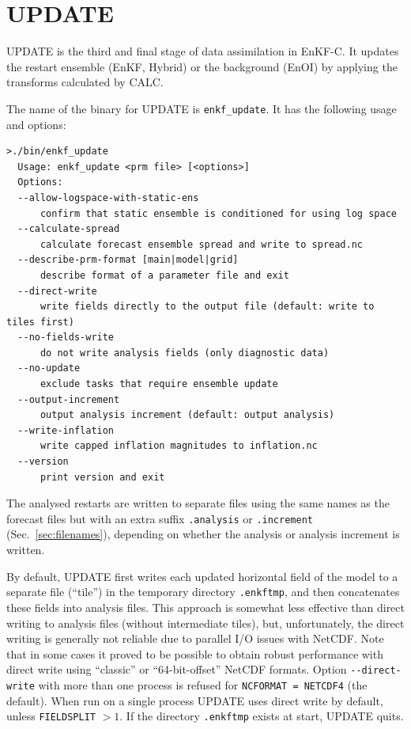 \documentclass[11pt]{report}
\begin{document}
\section{UPDATE}

UPDATE is the third and final stage of data assimilation in EnKF-C.
It updates the restart ensemble (EnKF, Hybrid) or the background (EnOI) by applying the transforms calculated by CALC.

The name of the binary for UPDATE is \verb|enkf_update|.
It has the following usage and options:
\begin{Verbatim}[frame=single,fontsize=\footnotesize]
>./bin/enkf_update
  Usage: enkf_update <prm file> [<options>]
  Options:
  --allow-logspace-with-static-ens
      confirm that static ensemble is conditioned for using log space
  --calculate-spread
      calculate forecast ensemble spread and write to spread.nc
  --describe-prm-format [main|model|grid]
      describe format of a parameter file and exit
  --direct-write
      write fields directly to the output file (default: write to tiles first)
  --no-fields-write
      do not write analysis fields (only diagnostic data)
  --no-update
      exclude tasks that require ensemble update
  --output-increment
      output analysis increment (default: output analysis)
  --write-inflation
      write capped inflation magnitudes to inflation.nc
  --version
      print version and exit
\end{Verbatim}

The analysed restarts are written to separate files using the same names as the forecast files but with an extra suffix \verb|.analysis| or \verb|.increment| (Sec.~\ref{sec:filenames}), depending on whether the analysis or analysis increment is written.

By default, UPDATE first writes each updated horizontal field of the model to a separate file (``tile'') in the temporary directory \verb|.enkftmp|, and then concatenates these fields into analysis files.
This approach is somewhat less effective than direct writing to analysis files (without intermediate tiles), but, unfortunately, the direct writing is generally not reliable due to parallel I/O issues with NetCDF.
Note that in some cases it proved to be possible to obtain robust performance with direct write using ``classic'' or ``64-bit-offset'' NetCDF formats.
Option \verb|--direct-write| with more than one process is refused for \verb|NCFORMAT = NETCDF4| (the default).
When run on a single process UPDATE uses direct write by default, unless \verb|FIELDSPLIT| $> 1$.
If the directory \verb|.enkftmp| exists at start, UPDATE quits.
\end{document}
